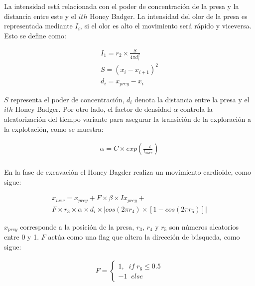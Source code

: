 \documentclass[conference]{IEEEtran}
\begin{document}
La intensidad está relacionada con el poder de concentración de la presa y la distancia entre este y el $ith$ Honey Badger. La intensidad del olor de la presa es representada mediante $I_i$, si el olor es alto el movimiento será rápido y viceversa. Esto se define como:

\begin{equation}
\begin{gathered}
I_1 = r_2 \times \frac{S}{4 \pi d_i^2}\\
S = (x_i -x_{i+1})^2\\
d_i = x_{prey} - x_i
\end{gathered}
\label{eq28}
\end{equation}

$S$ representa el poder de concentración, $d_i$ denota la distancia entre la presa y el $ith$ Honey Badger. Por otro lado, el factor de densidad $\alpha$ controla la aleatorización del tiempo variante para asegurar la transición de la exploración a la explotación, como se muestra:

\begin{equation}
\begin{gathered}
\alpha = C \times exp (\frac{-t}{t_{max}})\\
\end{gathered}
\label{eq29}
\end{equation}

En la fase de excavación el Honey Bagder realiza un movimiento cardioide, como sigue:

\begin{equation}
\begin{gathered}
x_{new}=x_{prey}+F \times \beta \times I x_{prey} + \\
F \times r_3 \times \alpha \times d_i  \times |cos(2\pi r_4) \times [1-cos(2\pi r_5)]|
\end{gathered}
\label{eq30}
\end{equation}

$x_{prey}$ corresponde a la posición de la presa, $r_3$, $r_4$ y $r_5$ son números aleatorios entre 0 y 1. $F$ actúa como una flag que altera la dirección de búsqueda, como sigue:

\begin{equation}
\begin{gathered}
F=
\begin{cases}
1, \; \; if \; r_6 \leq 0.5 \\
-1 \; \; else
\end{cases}
\end{gathered}
\label{eq31}
\end{equation}    
\end{document}
